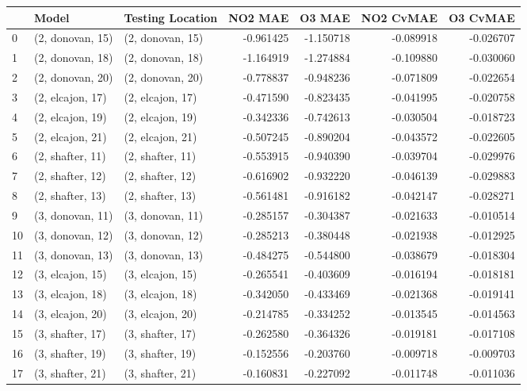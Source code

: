 \begin{tabular}{lllrrrr}
\toprule
{} &             Model &  Testing Location &   NO2 MAE &    O3 MAE &  NO2 CvMAE &  O3 CvMAE \\
\midrule
0  &  (2, donovan, 15) &  (2, donovan, 15) & -0.961425 & -1.150718 &  -0.089918 & -0.026707 \\
1  &  (2, donovan, 18) &  (2, donovan, 18) & -1.164919 & -1.274884 &  -0.109880 & -0.030060 \\
2  &  (2, donovan, 20) &  (2, donovan, 20) & -0.778837 & -0.948236 &  -0.071809 & -0.022654 \\
3  &  (2, elcajon, 17) &  (2, elcajon, 17) & -0.471590 & -0.823435 &  -0.041995 & -0.020758 \\
4  &  (2, elcajon, 19) &  (2, elcajon, 19) & -0.342336 & -0.742613 &  -0.030504 & -0.018723 \\
5  &  (2, elcajon, 21) &  (2, elcajon, 21) & -0.507245 & -0.890204 &  -0.043572 & -0.022605 \\
6  &  (2, shafter, 11) &  (2, shafter, 11) & -0.553915 & -0.940390 &  -0.039704 & -0.029976 \\
7  &  (2, shafter, 12) &  (2, shafter, 12) & -0.616902 & -0.932220 &  -0.046139 & -0.029883 \\
8  &  (2, shafter, 13) &  (2, shafter, 13) & -0.561481 & -0.916182 &  -0.042147 & -0.028271 \\
9  &  (3, donovan, 11) &  (3, donovan, 11) & -0.285157 & -0.304387 &  -0.021633 & -0.010514 \\
10 &  (3, donovan, 12) &  (3, donovan, 12) & -0.285213 & -0.380448 &  -0.021938 & -0.012925 \\
11 &  (3, donovan, 13) &  (3, donovan, 13) & -0.484275 & -0.544800 &  -0.038679 & -0.018304 \\
12 &  (3, elcajon, 15) &  (3, elcajon, 15) & -0.265541 & -0.403609 &  -0.016194 & -0.018181 \\
13 &  (3, elcajon, 18) &  (3, elcajon, 18) & -0.342050 & -0.433469 &  -0.021368 & -0.019141 \\
14 &  (3, elcajon, 20) &  (3, elcajon, 20) & -0.214785 & -0.334252 &  -0.013545 & -0.014563 \\
15 &  (3, shafter, 17) &  (3, shafter, 17) & -0.262580 & -0.364326 &  -0.019181 & -0.017108 \\
16 &  (3, shafter, 19) &  (3, shafter, 19) & -0.152556 & -0.203760 &  -0.009718 & -0.009703 \\
17 &  (3, shafter, 21) &  (3, shafter, 21) & -0.160831 & -0.227092 &  -0.011748 & -0.011036 \\

\end{tabular}
